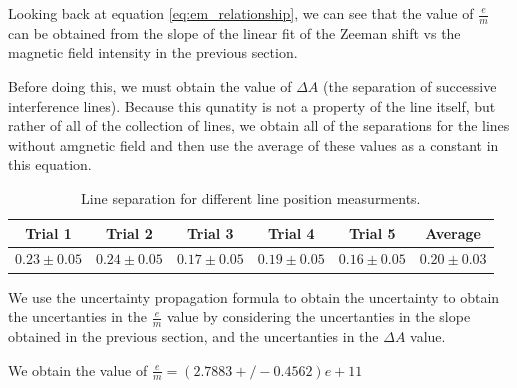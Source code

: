 Looking back at equation \ref{eq:em_relationship}, we can see that the value of $\frac{e}{m}$ can be obtained from the slope of the linear fit of the Zeeman shift vs the magnetic field intensity in the previous section.

Before doing this, we must obtain the value of $\Delta A$ (the separation of successive interference lines). Because this qunatity is not a property
of the line itself, but rather of all of the collection of lines, we obtain all of the separations for the lines without amgnetic field
and then use the average of these values as a constant in this equation.

\def\lineUncertainty{0.05}
\begin{table}[h]
    \centering
    \begin{tabular}{|c|c|c|c|c|c|}
        \hline
        Trial 1                     & Trial 2                     & Trial 3                     & Trial 4                     & Trial 5                     & Average         \\
        \hline
        $0.23 \pm \lineUncertainty$ & $0.24 \pm \lineUncertainty$ & $0.17 \pm \lineUncertainty$ & $0.19 \pm \lineUncertainty$ & $0.16 \pm \lineUncertainty$ & $0.20 \pm 0.03$ \\
        \hline
    \end{tabular}
    \caption{Line separation for different line position measurments.}
    \label{your-label}
\end{table}



We use the uncertainty propagation formula to obtain the uncertainty to obtain the uncertanties in the $\frac{e}{m}$ value
by considering the uncertanties in the slope obtained in the previous section, and the uncertanties in the $\Delta A$ value.


We obtain the value of $\frac{e}{m} = (2.7883+/-0.4562)e+11$